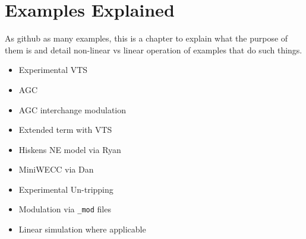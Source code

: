 \chapter{Examples Explained}
As github as many examples, this is a chapter to explain what the purpose of them is and detail non-linear vs linear operation of examples that do such things.

\begin{itemize}
\item Experimental VTS
\item AGC
\item AGC interchange modulation
\item Extended term with VTS
\item Hiskens NE model via Ryan
\item MiniWECC via Dan
\item Experimental Un-tripping
\item Modulation via \verb|_mod| files
\item Linear simulation where applicable
\end{itemize}